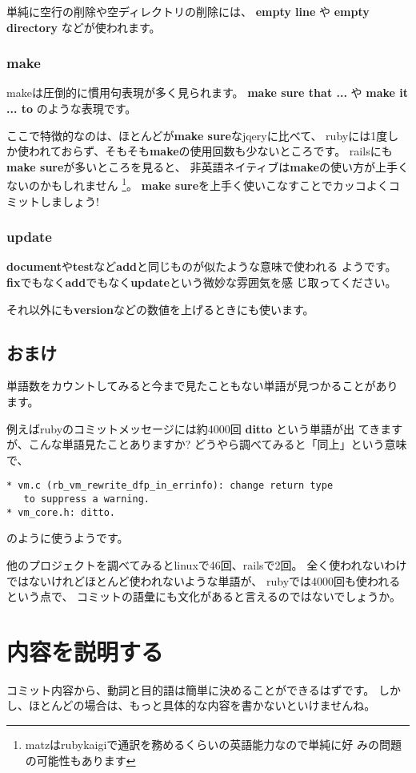 \documentclass{jarticle}
\begin{document}
   単純に空行の削除や空ディレクトリの削除には、
   {\bf empty line} や {\bf empty directory} などが使われます。

   \subsubsection{make}
   makeは圧倒的に慣用句表現が多く見られます。
   {\bf make sure that ...} や {\bf make it ... to} のような表現です。

   ここで特徴的なのは、ほとんどが{\bf make sure}なjqeryに比べて、
   rubyには1度しか使われておらず、そもそも{\bf make}の使用回数も少ないところです。
   railsにも{\bf make sure}が多いところを見ると、
   非英語ネイティブは{\bf make}の使い方が上手くないのかもしれません
   \footnote{matzはrubykaigiで通訳を務めるくらいの英語能力なので単純に好
   みの問題の可能性もあります}。
   {\bf make sure}を上手く使いこなすことでカッコよくコミットしましょう!

   \subsubsection{update}
   {\bf document}や{\bf test}など{\bf add}と同じものが似たような意味で使われる
   ようです。
   {\bf fix}でもなく{\bf add}でもなく{\bf update}という微妙な雰囲気を感
   じ取ってください。

   それ以外にも{\bf version}などの数値を上げるときにも使います。

  \subsection{おまけ}
  単語数をカウントしてみると今まで見たこともない単語が見つかることがあり
  ます。

  例えばrubyのコミットメッセージには約4000回 {\bf ditto} という単語が出
  てきますが、こんな単語見たことありますか?
  どうやら調べてみると「同上」という意味で、
\begin{verbatim}
* vm.c (rb_vm_rewrite_dfp_in_errinfo): change return type
   to suppress a warning.
* vm_core.h: ditto.
\end{verbatim}
  のように使うようです。

  他のプロジェクトを調べてみるとlinuxで46回、railsで2回。
  全く使われないわけではないけれどほとんど使われないような単語が、
  rubyでは4000回も使われるという点で、
  コミットの語彙にも文化があると言えるのではないでしょうか。

  \newpage
 \section{内容を説明する}
 コミット内容から、動詞と目的語は簡単に決めることができるはずです。
 しかし、ほとんどの場合は、もっと具体的な内容を書かないといけませんね。
\end{document}
